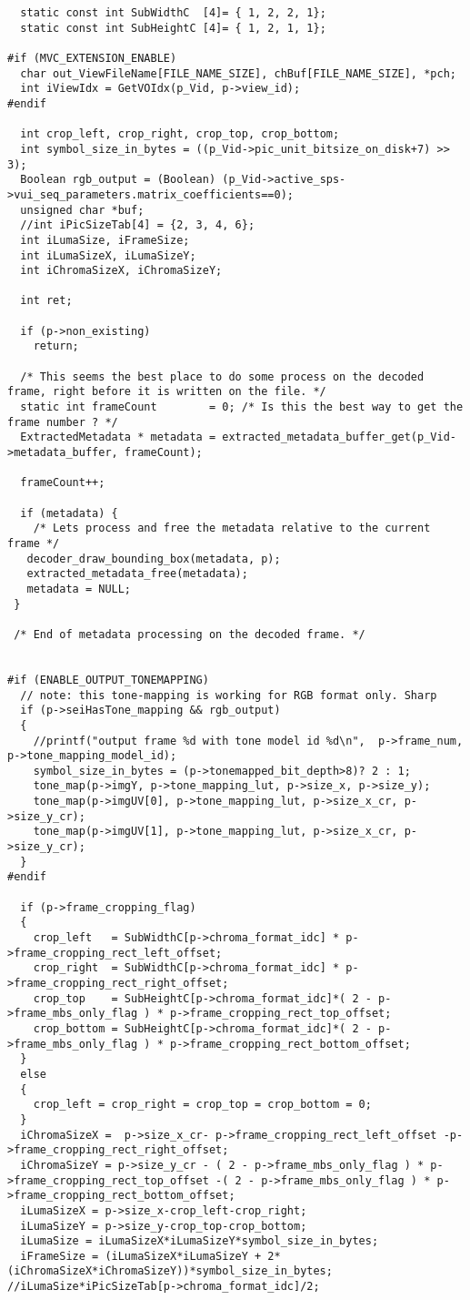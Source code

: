 \begin{lstlisting}
  static const int SubWidthC  [4]= { 1, 2, 2, 1};
  static const int SubHeightC [4]= { 1, 2, 1, 1};

#if (MVC_EXTENSION_ENABLE)
  char out_ViewFileName[FILE_NAME_SIZE], chBuf[FILE_NAME_SIZE], *pch;  
  int iViewIdx = GetVOIdx(p_Vid, p->view_id);
#endif

  int crop_left, crop_right, crop_top, crop_bottom;
  int symbol_size_in_bytes = ((p_Vid->pic_unit_bitsize_on_disk+7) >> 3);
  Boolean rgb_output = (Boolean) (p_Vid->active_sps->vui_seq_parameters.matrix_coefficients==0);
  unsigned char *buf;
  //int iPicSizeTab[4] = {2, 3, 4, 6};
  int iLumaSize, iFrameSize;
  int iLumaSizeX, iLumaSizeY;
  int iChromaSizeX, iChromaSizeY;

  int ret;

  if (p->non_existing)
    return;

  /* This seems the best place to do some process on the decoded frame, right before it is written on the file. */
  static int frameCount        = 0; /* Is this the best way to get the frame number ? */
  ExtractedMetadata * metadata = extracted_metadata_buffer_get(p_Vid->metadata_buffer, frameCount);

  frameCount++;

  if (metadata) {
    /* Lets process and free the metadata relative to the current frame */
   decoder_draw_bounding_box(metadata, p);
   extracted_metadata_free(metadata);
   metadata = NULL;
 }

 /* End of metadata processing on the decoded frame. */


#if (ENABLE_OUTPUT_TONEMAPPING)
  // note: this tone-mapping is working for RGB format only. Sharp
  if (p->seiHasTone_mapping && rgb_output)
  {
    //printf("output frame %d with tone model id %d\n",  p->frame_num, p->tone_mapping_model_id);
    symbol_size_in_bytes = (p->tonemapped_bit_depth>8)? 2 : 1;
    tone_map(p->imgY, p->tone_mapping_lut, p->size_x, p->size_y);
    tone_map(p->imgUV[0], p->tone_mapping_lut, p->size_x_cr, p->size_y_cr);
    tone_map(p->imgUV[1], p->tone_mapping_lut, p->size_x_cr, p->size_y_cr);
  }
#endif

  if (p->frame_cropping_flag)
  {
    crop_left   = SubWidthC[p->chroma_format_idc] * p->frame_cropping_rect_left_offset;
    crop_right  = SubWidthC[p->chroma_format_idc] * p->frame_cropping_rect_right_offset;
    crop_top    = SubHeightC[p->chroma_format_idc]*( 2 - p->frame_mbs_only_flag ) * p->frame_cropping_rect_top_offset;
    crop_bottom = SubHeightC[p->chroma_format_idc]*( 2 - p->frame_mbs_only_flag ) * p->frame_cropping_rect_bottom_offset;
  }
  else
  {
    crop_left = crop_right = crop_top = crop_bottom = 0;
  }
  iChromaSizeX =  p->size_x_cr- p->frame_cropping_rect_left_offset -p->frame_cropping_rect_right_offset;
  iChromaSizeY = p->size_y_cr - ( 2 - p->frame_mbs_only_flag ) * p->frame_cropping_rect_top_offset -( 2 - p->frame_mbs_only_flag ) * p->frame_cropping_rect_bottom_offset;
  iLumaSizeX = p->size_x-crop_left-crop_right;
  iLumaSizeY = p->size_y-crop_top-crop_bottom;
  iLumaSize = iLumaSizeX*iLumaSizeY*symbol_size_in_bytes;
  iFrameSize = (iLumaSizeX*iLumaSizeY + 2*(iChromaSizeX*iChromaSizeY))*symbol_size_in_bytes; //iLumaSize*iPicSizeTab[p->chroma_format_idc]/2;


\end{lstlisting}
